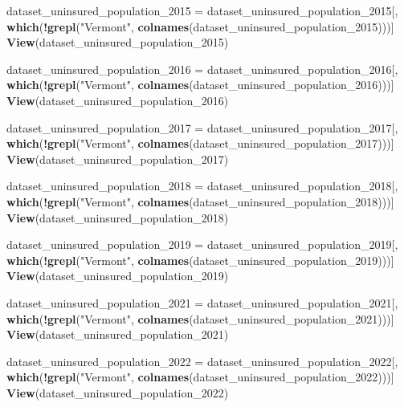 \documentclass[
]{article}
\newenvironment{Shaded}{\begin{snugshade}}{\end{snugshade}}
\newcommand{\FunctionTok}[1]{\textcolor[rgb]{0.13,0.29,0.53}{\textbf{#1}}}
\newcommand{\NormalTok}[1]{#1}
\newcommand{\OtherTok}[1]{\textcolor[rgb]{0.56,0.35,0.01}{#1}}
\newcommand{\SpecialCharTok}[1]{\textcolor[rgb]{0.81,0.36,0.00}{\textbf{#1}}}
\newcommand{\StringTok}[1]{\textcolor[rgb]{0.31,0.60,0.02}{#1}}
\begin{document}
\begin{Shaded}
\begin{Highlighting}[]
\NormalTok{dataset\_uninsured\_population\_2015 }\OtherTok{=}\NormalTok{ dataset\_uninsured\_population\_2015[, }\FunctionTok{which}\NormalTok{(}\SpecialCharTok{!}\FunctionTok{grepl}\NormalTok{(}\StringTok{"Vermont"}\NormalTok{, }\FunctionTok{colnames}\NormalTok{(dataset\_uninsured\_population\_2015)))]}
\FunctionTok{View}\NormalTok{(dataset\_uninsured\_population\_2015)}

\NormalTok{dataset\_uninsured\_population\_2016 }\OtherTok{=}\NormalTok{ dataset\_uninsured\_population\_2016[, }\FunctionTok{which}\NormalTok{(}\SpecialCharTok{!}\FunctionTok{grepl}\NormalTok{(}\StringTok{"Vermont"}\NormalTok{, }\FunctionTok{colnames}\NormalTok{(dataset\_uninsured\_population\_2016)))]}
\FunctionTok{View}\NormalTok{(dataset\_uninsured\_population\_2016)}

\NormalTok{dataset\_uninsured\_population\_2017 }\OtherTok{=}\NormalTok{ dataset\_uninsured\_population\_2017[, }\FunctionTok{which}\NormalTok{(}\SpecialCharTok{!}\FunctionTok{grepl}\NormalTok{(}\StringTok{"Vermont"}\NormalTok{, }\FunctionTok{colnames}\NormalTok{(dataset\_uninsured\_population\_2017)))]}
\FunctionTok{View}\NormalTok{(dataset\_uninsured\_population\_2017)}

\NormalTok{dataset\_uninsured\_population\_2018 }\OtherTok{=}\NormalTok{ dataset\_uninsured\_population\_2018[, }\FunctionTok{which}\NormalTok{(}\SpecialCharTok{!}\FunctionTok{grepl}\NormalTok{(}\StringTok{"Vermont"}\NormalTok{, }\FunctionTok{colnames}\NormalTok{(dataset\_uninsured\_population\_2018)))]}
\FunctionTok{View}\NormalTok{(dataset\_uninsured\_population\_2018)}

\NormalTok{dataset\_uninsured\_population\_2019 }\OtherTok{=}\NormalTok{ dataset\_uninsured\_population\_2019[, }\FunctionTok{which}\NormalTok{(}\SpecialCharTok{!}\FunctionTok{grepl}\NormalTok{(}\StringTok{"Vermont"}\NormalTok{, }\FunctionTok{colnames}\NormalTok{(dataset\_uninsured\_population\_2019)))]}
\FunctionTok{View}\NormalTok{(dataset\_uninsured\_population\_2019)}

\NormalTok{dataset\_uninsured\_population\_2021 }\OtherTok{=}\NormalTok{ dataset\_uninsured\_population\_2021[, }\FunctionTok{which}\NormalTok{(}\SpecialCharTok{!}\FunctionTok{grepl}\NormalTok{(}\StringTok{"Vermont"}\NormalTok{, }\FunctionTok{colnames}\NormalTok{(dataset\_uninsured\_population\_2021)))]}
\FunctionTok{View}\NormalTok{(dataset\_uninsured\_population\_2021)}

\NormalTok{dataset\_uninsured\_population\_2022 }\OtherTok{=}\NormalTok{ dataset\_uninsured\_population\_2022[, }\FunctionTok{which}\NormalTok{(}\SpecialCharTok{!}\FunctionTok{grepl}\NormalTok{(}\StringTok{"Vermont"}\NormalTok{, }\FunctionTok{colnames}\NormalTok{(dataset\_uninsured\_population\_2022)))]}
\FunctionTok{View}\NormalTok{(dataset\_uninsured\_population\_2022)}


\end{Highlighting}
\end{Shaded}
\end{document}
